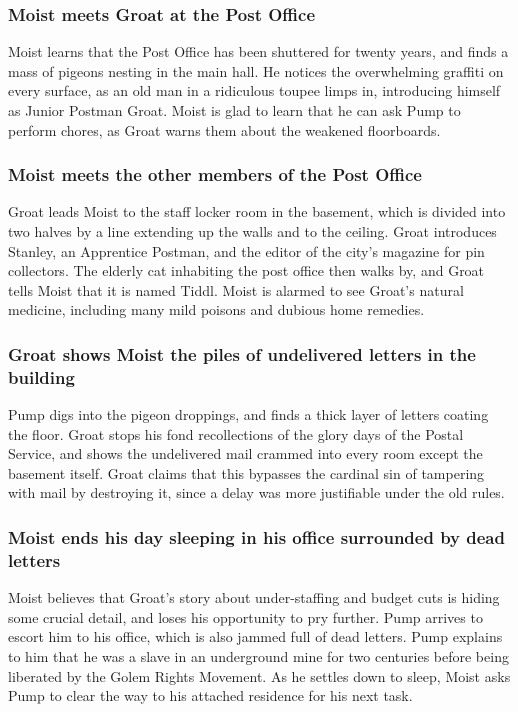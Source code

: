 \subsubsection{\Gls{Moist} meets \Gls{Groat} at the Post Office}
\Gls{Moist} learns that the Post Office has been shuttered for twenty years, and finds a mass of
pigeons nesting in the main hall. He notices the overwhelming graffiti on every surface, as an old
man in a ridiculous toupee limps in, introducing himself as Junior Postman \Gls{Groat}. \Gls{Moist}
is glad to learn that he can ask \Gls{Pump} to perform chores, as \Gls{Groat} warns them about the
weakened floorboards.

\subsubsection{\Gls{Moist} meets the other members of the Post Office}
\Gls{Groat} leads \Gls{Moist} to the staff locker room in the basement, which is divided into two
halves by a line extending up the walls and to the ceiling. \Gls{Groat} introduces \Gls{Stanley},
an Apprentice Postman, and the editor of the city's magazine for pin collectors. The elderly cat
inhabiting the post office then walks by, and \Gls{Groat} tells \Gls{Moist} that it is named
\Gls{Tiddl}. \Gls{Moist} is alarmed to see \Gls{Groat}'s natural medicine, including many mild
poisons and dubious home remedies.

\subsubsection{\Gls{Groat} shows \Gls{Moist} the piles of undelivered letters in the building}
\Gls{Pump} digs into the pigeon droppings, and finds a thick layer of letters coating the floor.
\Gls{Groat} stops his fond recollections of the glory days of the Postal Service, and shows the
undelivered mail crammed into every room except the basement itself. \Gls{Groat} claims that this
bypasses the cardinal sin of tampering with mail by destroying it, since a delay was more
justifiable under the old rules.

\subsubsection{\Gls{Moist} ends his day sleeping in his office surrounded by dead letters}
\Gls{Moist} believes that \Gls{Groat}'s story about under-staffing and budget cuts is hiding some
crucial detail, and loses his opportunity to pry further. \Gls{Pump} arrives to escort him to his
office, which is also jammed full of dead letters. \Gls{Pump} explains to him that he was a slave
in an underground mine for two centuries before being liberated by the Golem Rights Movement. As
he settles down to sleep, \Gls{Moist} asks \Gls{Pump} to clear the way to his attached residence
for his next task.

